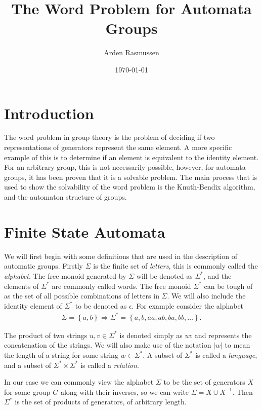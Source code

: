 \documentclass[10pt]{amsart}
\title{The Word Problem for Automata Groups}
\author{Arden Rasmussen}
\date{\today}
\theoremstyle{definition}
\begin{document}
\maketitle

\section{Introduction}%
\label{sec:Introduction}

The word problem in group theory is the problem of deciding if two
representations of generators represent the same element. A more specific
example of this is to determine if an element is equivalent to the identity
element. For an arbitrary group, this is not necessarily possible, however, for
automata groups, it has been proven that it is a solvable problem. The main
process that is used to show the solvability of the word problem is the
Knuth-Bendix algorithm, and the automaton structure of groups.

\section{Finite State Automata}%
\label{sec:finite_state_automata}

We will first begin with some definitions that are used in the description of
automatic groups. Firstly $\Sigma$ is the finite set of \textit{letters}, this
is commonly called the \textit{alphabet}. The free monoid generated by $\Sigma$
will be denoted as $\Sigma^*$, and the elements of $\Sigma^*$ are commonly
called words. The free monoid $\Sigma^*$ can be tough of as the set of all
possible combinations of letters in $\Sigma$. We will also include the identity
element of $\Sigma^*$ to be denoted as $\epsilon$. For example consider the alphabet
\begin{align*}
  \Sigma=\left\{a,b\right\}\Rightarrow\Sigma^*=\left\{a,b,aa,ab,ba,bb,\ldots\right\}.
\end{align*}

The product of two strings $u,v\in\Sigma^*$ is denoted simply as $uv$ and
represents the concatenation of the strings. We will also make use of the
notation $|w|$ to mean the length of a string for some string $w\in\Sigma^*$. A
subset of $\Sigma^*$ is called a \textit{language}, and a subset of
$\Sigma^*\times\Sigma^*$ is called a \textit{relation}.

In our case we can commonly view the alphabet $\Sigma$ to be the set of
generators $X$ for some group $G$ along with their inverses, so we can write
$\Sigma=X\cup X^{-1}$. Then $\Sigma^*$ is the set of products of
generators, of arbitrary length.
\end{document}
